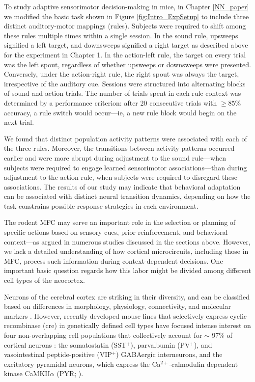 To study adaptive sensorimotor decision-making in mice, in Chapter \ref{NN_paper} we modified the basic task shown in Figure \ref{fig:Intro_ExpSetup} to include three distinct auditory-motor mappings (rules). Subjects were required to shift among these rules multiple times within a single session. In the sound rule, upsweeps signified a left target, and downsweeps signified a right target as described above for the experiment in Chapter 1. In the action-left rule, the target on every trial was the left spout, regardless of whether upsweeps or downsweeps were presented. Conversely, under the action-right rule, the right spout was always the target, irrespective of the auditory cue. Sessions were structured into alternating blocks of sound and action trials. The number of trials spent in each rule context was determined by a performance criterion: after 20 consecutive trials with $\geq 85\%$  accuracy, a rule switch would occur---ie, a new rule block would begin on the next trial.

We found that distinct population activity patterns were associated with each of the three rules. Moreover, the transitions between activity patterns occurred earlier and were more abrupt during adjustment to the sound rule---when subjects were required to engage learned sensorimotor associations---than during adjustment to the action rule, when subjects were required to disregard these associations. The results of our study may indicate that behavioral adaptation can be associated with distinct neural transition dynamics, depending on how the task constrains possible response strategies in each environment.


The rodent MFC may serve an important role in the selection or planning of specific actions based on sensory cues, prior reinforcement, and behavioral context---as argued in numerous studies discussed in the sections above. However, we lack a detailed understanding of how cortical microcircuits, including those in MFC, process such information during context-dependent decisions. One important basic question regards how this labor might be divided among different cell types of the neocortex. 

Neurons of the cerebral cortex are striking in their diversity, and can be classified based on differences in morphology, physiology, connectivity, and molecular markers \citep{connors1990intrinsic,kubota1994three,kawaguchi1995physiological,tremblay2016gabaergic,huang2019diversity}. However, recently developed mouse lines that selectively express cyclic recombinase (cre) in genetically defined cell types \citep{taniguchi11} have focused intense interest on four non-overlapping cell populations that collectively account for $\sim$ 97\% of cortical neurons \citep{tremblay2016gabaergic}: the somatostatin (SST$^+$), parvalbumin (PV$^+$), and vasointestinal peptide-positive (VIP$^+$) GABAergic interneurons, and the excitatory pyramidal neurons, which express the Ca$^{2+}$-calmodulin dependent kinase CaMKII$\alpha$ (PYR; \citep{jones1994alpha,wang2013distribution}).

